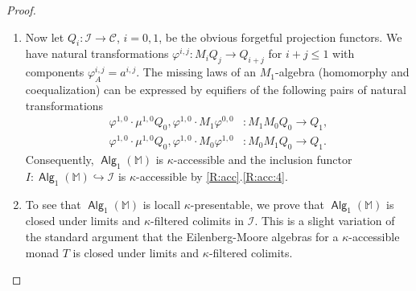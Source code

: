 \documentclass[sigconf,
			final%
			nonacm
                        ]{acmart}
\numberwithin{equation}{section}
\numberwithin{equation}{section}
\theoremstyle{plain}
\theoremstyle{definition}
\newcommand{\subto}{\hookrightarrow}
\newcommand{\epito}{\twoheadrightarrow}
\newcommand{\M}{\mathbb{M}}                   %
\newcommand{\CatC}{\mathscr{C}}           %
\newcommand{\CatK}{\mathscr{K}}
\newcommand{\CatI}{\mathscr{I}}
\DeclareMathOperator{\Alg}{\mathsf{Alg}}
\newcommand{\Id}{\mathsf{Id}}                 %
\begin{document}
\begin{proof}
\begin{enumerate}
    From \cref{R:adj}.\ref{R:adj:1} we obtain that for every
    $\kappa$-presentable object in $\CatK$, i.e.~a pair $A$ formed by
    $\kappa$-presentable objects $(A_i, a^{0,i})$, $i = 0,1$, the
    object $LA$ is $\kappa$-presentable in $\CatI$. We show that the
    these $\kappa$-presentable objects $LA$ form a strong generator in
    $\CatI$. By \cref{R:acc}.\ref{R:acc:1a}, it follows that $\CatI$
    is locally $\kappa$-presentable. Given an object $A$ of $\CatI$
    we know that $VA$ is an extremal quotient of a coproduct of
    $\kappa$-presentable objects in $\CatK$, reprensented, say, by the
    extremal epimorphism
    \[\textstyle
      e\colon \coprod_{j\in J} A_j \epito VA
    \]
    for some set $J$. Using \cref{R:adj}.\ref{R:adj:1}, that the
    left-adjoint $L$ preserves coproducts and that $V$ reflects
    isomorphisms and is clearly faithful we thus see that the adjoint
    transpose
    \[\textstyle
      \bar e\colon \coprod_{j\in J} LA_j \epito A
    \]
    exhibits $A$ as an extremal quotient of the coproduct of the
    $\kappa$-presentable objects $LA_j$.

  \item Now let $Q_i\colon \CatI \to \CatC$, $i = 0,1$, be the obvious
    forgetful projection functors. We have natural transformations
    $\varphi^{i,j}\colon M_iQ_j \to Q_{i+j}$ for $i+j \leq 1$ with
    components $\varphi^{i,j}_A = a^{i,j}$. The missing laws of an
    $M_1$-algebra (homomorphy and coequalization) can be expressed by
    equifiers of the following pairs of natural transformations
    \begin{align*}
      \varphi^{1,0} \cdot \mu^{1,0} Q_0, \varphi^{1,0} \cdot
      M_1\varphi^{0,0}
      &\colon M_1M_0Q_0 \to Q_1,
      \\
      \varphi^{1,0}\cdot \mu^{1,0} Q_0, \varphi^{1,0}\cdot
      M_0\varphi^{1,0}
      &
      \colon M_0M_1Q_0 \to Q_1.
    \end{align*}
    Consequently, $\Alg_1(\M)$ is $\kappa$-accessible and the
    inclusion functor $I\colon\Alg_1(\M) \subto \CatI$ is $\kappa$-accessible
    by \cref{R:acc}.\ref{R:acc:4}.

  \item To see that $\Alg_1(\M)$ is locall $\kappa$-presentable, we
    prove that $\Alg_1(\M)$ is closed under limits and
    $\kappa$-filtered colimits in $\CatI$. This is a slight variation
    of the standard argument that the Eilenberg-Moore
    algebras for a $\kappa$-accessible monad $T$ is closed under
    limits and $\kappa$-filtered colimits.


\end{enumerate}
\end{proof}
\end{document}
